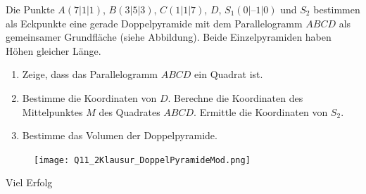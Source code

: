 \documentclass[a4paper,12pt]{article}
\begin{document}
\begin{minipage}[t]{0.7\textwidth}
Die Punkte $A(7|1|1)$, $B(3|5|3)$, $C(1|1|7)$, $D$, $S_1(0|\text{--}1|0)$ und $S_2$ bestimmen als Eckpunkte eine gerade Doppelpyramide mit dem Parallelogramm $ABCD$ als gemeinsamer Grundfläche (siehe Abbildung). Beide Einzelpyramiden haben Höhen gleicher Länge.

\begin{enumerate}[label={\alph*)}]
  \item Zeige, dass das Parallelogramm $ABCD$ ein Quadrat ist.
  \item Bestimme die Koordinaten von $D$. Berechne die Koordinaten des Mittelpunktes $M$ des Quadrates $ABCD$. Ermittle die Koordinaten von $S_2$.
  \item Bestimme das Volumen der Doppelpyramide.

\end{enumerate}
\end{minipage}
\hspace*{0.75cm}
\begin{minipage}[t]{0.35\textwidth}
  \begin{figure}[H]
    \vspace{-1cm}
    \centering
    \texttt{[image: Q11\_2Klausur\_DoppelPyramideMod.png]}
  \end{figure}
\end{minipage}





\vspace{2.5cm}
\centerline{Viel Erfolg \faThumbsOUp }
\end{document}
